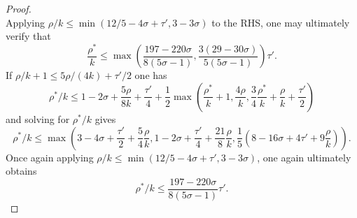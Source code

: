 \begin{proof}
\[\]
Applying $\rho/k \le \min(12/5 - 4\sigma + \tau', 3 - 3\sigma)$ to the RHS, one may ultimately verify that 
\[
\frac{\rho^*}{k} \le \max\left(\frac{197 - 220\sigma}{8(5\sigma - 1)}, \frac{3(29 - 30\sigma)}{5(5\sigma - 1)}\right)\tau'.
\]
If $\rho/k + 1 \le 5\rho/(4k) + \tau'/2$ one has 
\[
\rho^*/k \leq 1-2\sigma + \frac{5\rho}{8k} + \frac{\tau'}{4} + \frac{1}{2}\max(\frac{\rho^*}{k}+1, \frac{4\rho}{k}, \frac{3}{4}\frac{\rho^*}{k} + \frac{\rho}{k}+\frac{\tau'}{2})
\]
and solving for $\rho^*/k$ gives 
\[
\rho^*/k \le \max(3 - 4\sigma + \frac{\tau'}{2} + \frac{5}{4}\frac{\rho}{k}, 1 - 2\sigma + \frac{\tau'}{4} + \frac{21}{8}\frac{\rho}{k}, \frac{1}{5}(8 - 16\sigma + 4\tau' + 9\frac{\rho}{k})).
\]
Once again applying $\rho/k \le \min(12/5 - 4\sigma + \tau', 3 - 3\sigma)$, one again ultimately obtains 
\[
\rho^*/k \le \frac{197 - 220\sigma}{8(5\sigma - 1)}\tau'.
\]


\end{proof}
